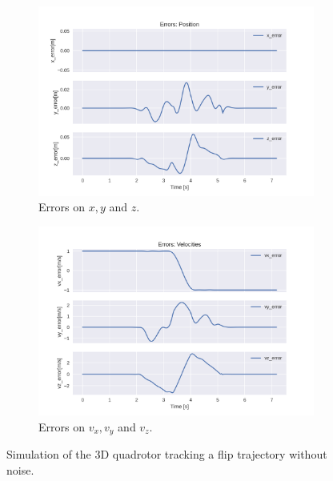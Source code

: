 \documentclass{thesisreport}
\begin{document}
\begin{figure}[H]
\medskip
	\begin{subfigure}{0.45\textwidth}
		\includegraphics[width=\linewidth]{Images/acados_simulations/flip_trajectory/3D_quadrotor/Errors_position.png}
		\caption{Errors on $x,y$ and $z$.} \label{fig:3D_flip_sim_errors_pose}
	\end{subfigure}\hspace*{\fill}
	\begin{subfigure}{0.45\textwidth}
		\includegraphics[width=\linewidth]{Images/acados_simulations/flip_trajectory/3D_quadrotor/Errors_velocities.png}
		\caption{Errors on $v_x, v_y$ and $v_z$.} \label{fig:3D_flip_sim_errors_velocities}
	\end{subfigure}

	\caption{Simulation of the 3D quadrotor tracking a flip trajectory without noise.} \label{fig:3D_sim_flip}
\end{figure}
\end{document}
